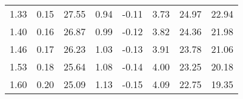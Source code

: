 \begin{tabular}{rrrrrrrr}
     1.33 &   0.15 &    27.55 &  0.94 & -0.11 &      3.73 &    24.97 &                  22.94 \\
     1.40 &   0.16 &    26.87 &  0.99 & -0.12 &      3.82 &    24.36 &                  21.98 \\
     1.46 &   0.17 &    26.23 &  1.03 & -0.13 &      3.91 &    23.78 &                  21.06 \\
     1.53 &   0.18 &    25.64 &  1.08 & -0.14 &      4.00 &    23.25 &                  20.18 \\
     1.60 &   0.20 &    25.09 &  1.13 & -0.15 &      4.09 &    22.75 &                  19.35 \\
   \bottomrule
   \end{tabular}
   